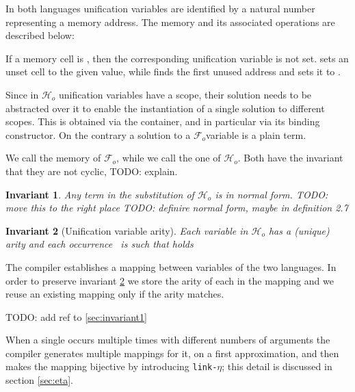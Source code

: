 \documentclass[sigconf,natbib=false,review]{acmart}
\newtheorem{invariant}{Invariant}
\newcommand{\linketa}{\texttt{link-}\ensuremath{\eta}\xspace}
\newcommand{\Fo}{\ensuremath{\mathcal{F}_{\!o}\xspace}} %
\newcommand{\Ho}{\ensuremath{\mathcal{H}_o}\xspace}
\begin{document}
In both languages unification variables are identified by a natural number
representing a memory address.
The memory and its associated operations are described below:



\noindent
If a memory cell is , then the corresponding unification variable
is not set.  sets an unset cell to the given value, while
 finds the first unused address and sets it to .

Since in \Ho unification variables have a scope, their solution needs to be
abstracted over it to enable the instantiation of a single
solution to different scopes. This is obtained via the 
container, and in particular via its  binding constructor.
On the contrary a solution to a \Fo variable is a plain term.




\noindent
We call  the memory of \Fo{}, while we call 
the one of \Ho.
Both have the invariant that they are not cyclic, TODO: explain.

\begin{invariant}
  Any term in the substitution of \Ho is in normal form.
  TODO: move this to the right place
  TODO: definire normal form, maybe in definition 2.7
  \label{inv:subst-nf}
\end{invariant}



\begin{invariant}[Unification variable arity]
  Each variable 
  in \Ho has a (unique) arity  and each occurrence~
   is such that  holds
  \label{inv:uvaarity}
\end{invariant}

\noindent
The compiler establishes a mapping between variables of the two languages.
In order to preserve invariant \ref{inv:uvaarity} we store the
arity of each  in the mapping and we reuse an existing
mapping only if the arity matches.

TODO: add ref to \cref{sec:invariant1}



\noindent
When a single  occurs multiple times with different numbers
of arguments the compiler generates multiple mappings for it, on a first
approximation, and then makes the mapping bijective by introducing
\linketa; this detail is discussed in section \ref{sec:eta}.
\end{document}
